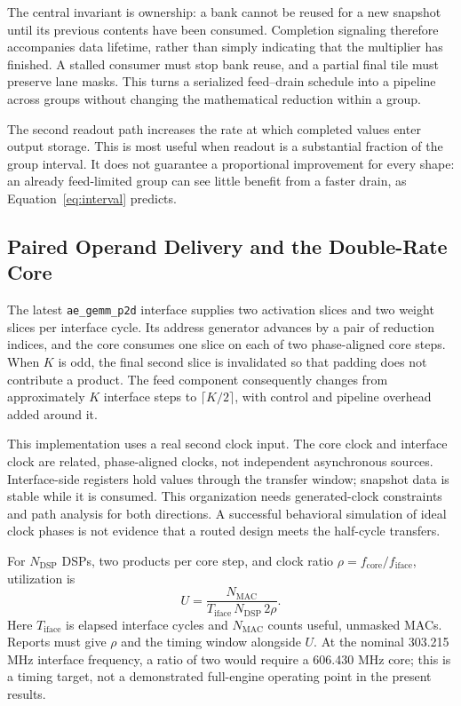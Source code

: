 \documentclass[10pt,conference,letterpaper]{IEEEtran}
\begin{document}
The central invariant is ownership: a bank cannot be reused for a new snapshot until its previous contents have been consumed. Completion signaling therefore accompanies data lifetime, rather than simply indicating that the multiplier has finished. A stalled consumer must stop bank reuse, and a partial final tile must preserve lane masks. This turns a serialized feed--drain schedule into a pipeline across groups without changing the mathematical reduction within a group.

The second readout path increases the rate at which completed values enter output storage. This is most useful when readout is a substantial fraction of the group interval. It does not guarantee a proportional improvement for every shape: an already feed-limited group can see little benefit from a faster drain, as Equation~\ref{eq:interval} predicts.

\subsection{Paired Operand Delivery and the Double-Rate Core}
The latest \texttt{ae\_gemm\_p2d} interface supplies two activation slices and two weight slices per interface cycle. Its address generator advances by a pair of reduction indices, and the core consumes one slice on each of two phase-aligned core steps. When $K$ is odd, the final second slice is invalidated so that padding does not contribute a product. The feed component consequently changes from approximately $K$ interface steps to $\lceil K/2\rceil$, with control and pipeline overhead added around it.

This implementation uses a real second clock input. The core clock and interface clock are related, phase-aligned clocks, not independent asynchronous sources. Interface-side registers hold values through the transfer window; snapshot data is stable while it is consumed. This organization needs generated-clock constraints and path analysis for both directions. A successful behavioral simulation of ideal clock phases is not evidence that a routed design meets the half-cycle transfers.

For $N_{\mathrm{DSP}}$ DSPs, two products per core step, and clock ratio $\rho=f_{\mathrm{core}}/f_{\mathrm{iface}}$, utilization is
\begin{equation}
U=\frac{N_{\mathrm{MAC}}}{T_{\mathrm{iface}}\,N_{\mathrm{DSP}}\,2\rho}.
\label{eq:util}
\end{equation}
Here $T_{\mathrm{iface}}$ is elapsed interface cycles and $N_{\mathrm{MAC}}$ counts useful, unmasked MACs. Reports must give $\rho$ and the timing window alongside $U$. At the nominal 303.215 MHz interface frequency, a ratio of two would require a 606.430 MHz core; this is a timing target, not a demonstrated full-engine operating point in the present results.
\end{document}
